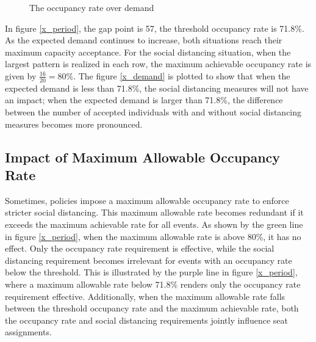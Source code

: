 \begin{figure}[h]
  \centering
  \caption{The occupancy rate over demand}
  \label{occupancy_rate_demand}
\end{figure}

In figure \ref{x_period}, the gap point is 57, the threshold occupancy rate is 71.8\%. As the expected demand continues to increase, both situations reach their maximum capacity acceptance. For the social distancing situation, when the largest pattern is realized in each row, the maximum achievable occupancy rate is given by $\frac{16}{20} = 80\%$. The figure \ref{x_demand} is plotted to show that when the expected demand is less than 71.8\%, the social distancing measures will not have an impact; when the expected demand is larger than 71.8\%, the difference between the number of accepted individuals with and without social distancing measures becomes more pronounced.

\subsection*{Impact of Maximum Allowable Occupancy Rate}
Sometimes, policies impose a maximum allowable occupancy rate to enforce stricter social distancing. This maximum allowable rate becomes redundant if it exceeds the maximum achievable rate for all events. As shown by the green line in figure \ref{x_period}, when the maximum allowable rate is above 80\%, it has no effect. Only the occupancy rate requirement is effective, while the social distancing requirement becomes irrelevant for events with an occupancy rate below the threshold. This is illustrated by the purple line in figure \ref{x_period}, where a maximum allowable rate below 71.8\% renders only the occupancy rate requirement effective. Additionally, when the maximum allowable rate falls between the threshold occupancy rate and the maximum achievable rate, both the occupancy rate and social distancing requirements jointly influence seat assignments.

